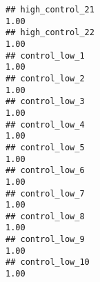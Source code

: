 \documentclass[
]{article}
\begin{document}
\begin{verbatim}
## high_control_21                                                                                                                                                                                                                1.00
## high_control_22                                                                                                                                                                                                                1.00
## control_low_1                                                                                                                                                                                                                  1.00
## control_low_2                                                                                                                                                                                                                  1.00
## control_low_3                                                                                                                                                                                                                  1.00
## control_low_4                                                                                                                                                                                                                  1.00
## control_low_5                                                                                                                                                                                                                  1.00
## control_low_6                                                                                                                                                                                                                  1.00
## control_low_7                                                                                                                                                                                                                  1.00
## control_low_8                                                                                                                                                                                                                  1.00
## control_low_9                                                                                                                                                                                                                  1.00
## control_low_10                                                                                                                                                                                                                 1.00

\end{verbatim}
\end{document}
